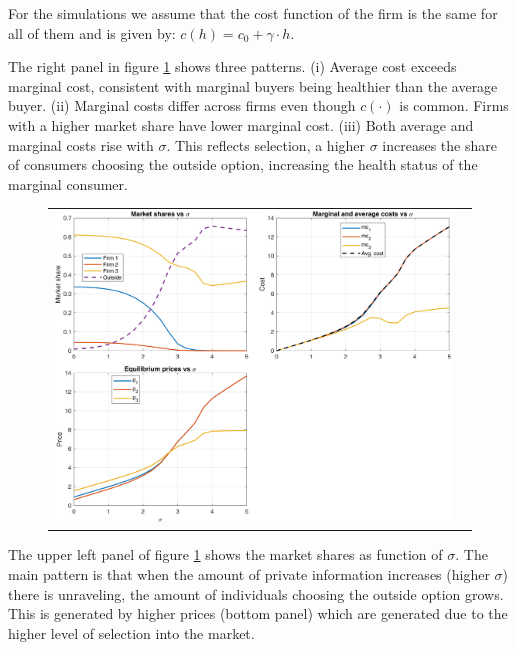 \documentclass[12pt]{article}
\theoremstyle{plain}
\theoremstyle{plain}
\begin{document}
For the simulations we assume that the cost function of the firm is the same for all of them and is given by: 
$c(h) = c_0 + \gamma \cdot h$. 



The right panel in figure \ref{fig:sigma}   shows three patterns. (i) Average cost exceeds marginal cost, consistent with marginal buyers being healthier than the average buyer. (ii) Marginal costs differ across firms even though  $c(\cdot)$ is common. Firms with a higher market share have lower marginal cost.  (iii) Both average and marginal costs rise with $\sigma$. This reflects selection, a higher $\sigma$ increases the share of consumers choosing the outside option, increasing the health status of the marginal consumer. 




\begin{figure}[H]
\caption{}
 \label{fig:sigma}
\centering{}%
\begin{tabular}{cc}
\includegraphics[scale=.7]{figures/simulations/sigma_panels.png} 
\end{tabular}
\end{figure}


The upper left panel of figure \ref{fig:sigma} shows the market shares as function of $\sigma$. The main pattern is that when the amount of private information increases (higher $\sigma$) there is unraveling, the amount of individuals choosing the outside option grows. This is generated by higher prices (bottom panel) which are generated due to the higher level of selection into the market. 
\end{document}
